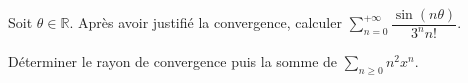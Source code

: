 \documentclass[a4paper,twoside,french,11pt]{VcCours}
\DeclareMathOperator{\e}{e}
\newcommand{\Sum}[2]{\sum_{#1}^{#2}}
\begin{document}

\begin{Exercice}{} Soit $\theta\in\mathbb{R}$. Après avoir justifié la convergence, calculer $\sum_{n=0}^{+\infty}\dfrac{\sin(n\theta)}{3^nn!}$.
\end{Exercice}


\begin{Exercice}{} Déterminer le rayon de convergence puis la somme de $\Sum{n \geq 0}{} n^2x^n$.
\end{Exercice}
\end{document}
